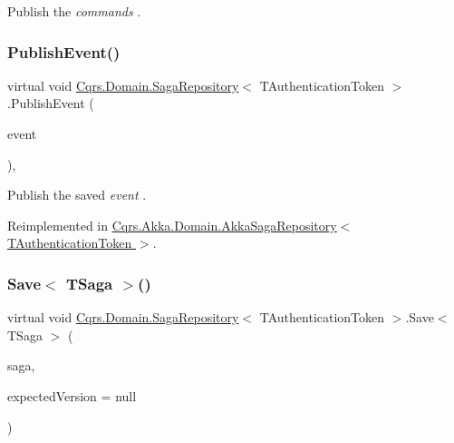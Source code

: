 Publish the {\itshape commands} . 

\mbox{\label{classCqrs_1_1Domain_1_1SagaRepository_a1dec03959e4d859c6cf2be0507b1bc05_a1dec03959e4d859c6cf2be0507b1bc05}} 
\subsubsection{\texorpdfstring{Publish\+Event()}{PublishEvent()}}
{\footnotesize\ttfamily virtual void \hyperlink{classCqrs_1_1Domain_1_1SagaRepository}{Cqrs.\+Domain.\+Saga\+Repository}$<$ T\+Authentication\+Token $>$.Publish\+Event (\begin{DoxyParamCaption}\item[{\hyperlink{interfaceCqrs_1_1Events_1_1ISagaEvent}{I\+Saga\+Event}$<$ T\+Authentication\+Token $>$ @}]{event }\end{DoxyParamCaption})\hspace{0.3cm}{\ttfamily [protected]}, {\ttfamily [virtual]}}



Publish the saved {\itshape event} . 



Reimplemented in \hyperlink{classCqrs_1_1Akka_1_1Domain_1_1AkkaSagaRepository_a7f6375bb99e680792466fb420232a535_a7f6375bb99e680792466fb420232a535}{Cqrs.\+Akka.\+Domain.\+Akka\+Saga\+Repository$<$ T\+Authentication\+Token $>$}.

\mbox{\label{classCqrs_1_1Domain_1_1SagaRepository_a84cae424cb01de22864ae7d960007cd0_a84cae424cb01de22864ae7d960007cd0}} 
\subsubsection{\texorpdfstring{Save$<$ T\+Saga $>$()}{Save< TSaga >()}}
{\footnotesize\ttfamily virtual void \hyperlink{classCqrs_1_1Domain_1_1SagaRepository}{Cqrs.\+Domain.\+Saga\+Repository}$<$ T\+Authentication\+Token $>$.Save$<$ T\+Saga $>$ (\begin{DoxyParamCaption}\item[{T\+Saga}]{saga,  }\item[{int?}]{expected\+Version = {\ttfamily null} }\end{DoxyParamCaption})\hspace{0.3cm}{\ttfamily [virtual]}}



